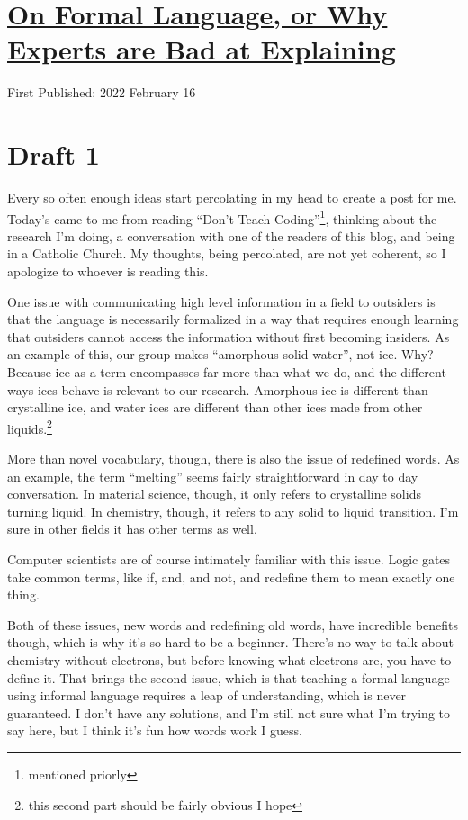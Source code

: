 \documentclass[12pt]{article}[titlepage]
\newcommand{\say}[1]{``#1''}
\newcommand{\1}{\={a}}
\newcommand{\2}{\={e}}
\newcommand{\3}{\={\i}}
\newcommand{\4}{\=o}
\newcommand{\5}{\=u}
\newcommand{\6}{\={A}}
\renewcommand{\,}{\textsuperscript{,}}
\begin{document}
\doublespacing
\section{\href{formal-language.html}{On Formal Language, or Why Experts are Bad at Explaining}}
First Published: 2022 February 16

\section{Draft 1}
Every so often enough ideas start percolating in my head to create a post for me.
Today's came to me from reading \say{Don't Teach Coding}\footnote{mentioned priorly}, thinking about the research I'm doing, a conversation with one of the readers of this blog, and being in a Catholic Church.
My thoughts, being percolated, are not yet coherent, so I apologize to whoever is reading this.

One issue with communicating high level information in a field to outsiders is that the language is necessarily formalized in a way that requires enough learning that outsiders cannot access the information without first becoming insiders.
As an example of this, our group makes \say{amorphous solid water}, not ice.
Why? Because ice as a term encompasses far more than what we do, and the different ways ices behave is relevant to our research.
Amorphous ice is different than crystalline ice, and water ices are different than other ices made from other liquids.\footnote{this second part should be fairly obvious I hope}

More than novel vocabulary, though, there is also the issue of redefined words.
As an example, the term \say{melting} seems fairly straightforward in day to day conversation.
In material science, though, it only refers to crystalline solids turning liquid.
In chemistry, though, it refers to any solid to liquid transition.
I'm sure in other fields it has other terms as well.

Computer scientists are of course intimately familiar with this issue.
Logic gates take common terms, like if, and, and not, and redefine them to mean exactly one thing.

Both of these issues, new words and redefining old words, have incredible benefits though, which is why it's so hard to be a beginner.
There's no way to talk about chemistry without electrons, but before knowing what electrons are, you have to define it.
That brings the second issue, which is that teaching a formal language using informal language requires a leap of understanding, which is never guaranteed.
I don't have any solutions, and I'm still not sure what I'm trying to say here, but I think it's fun how words work I guess.
\end{document}
